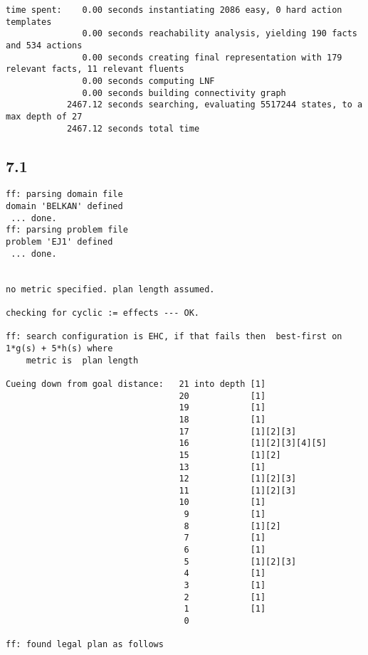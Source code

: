 \documentclass{article}
\begin{document}
\begin{lstlisting}
time spent:    0.00 seconds instantiating 2086 easy, 0 hard action templates
               0.00 seconds reachability analysis, yielding 190 facts and 534 actions
               0.00 seconds creating final representation with 179 relevant facts, 11 relevant fluents
               0.00 seconds computing LNF
               0.00 seconds building connectivity graph
            2467.12 seconds searching, evaluating 5517244 states, to a max depth of 27
            2467.12 seconds total time
\end{lstlisting}
\subsection*{7.1}
\begin{lstlisting}
ff: parsing domain file
domain 'BELKAN' defined
 ... done.
ff: parsing problem file
problem 'EJ1' defined
 ... done.


no metric specified. plan length assumed.

checking for cyclic := effects --- OK.

ff: search configuration is EHC, if that fails then  best-first on 1*g(s) + 5*h(s) where
    metric is  plan length

Cueing down from goal distance:   21 into depth [1]
                                  20            [1]
                                  19            [1]
                                  18            [1]
                                  17            [1][2][3]
                                  16            [1][2][3][4][5]
                                  15            [1][2]
                                  13            [1]
                                  12            [1][2][3]
                                  11            [1][2][3]
                                  10            [1]
                                   9            [1]
                                   8            [1][2]
                                   7            [1]
                                   6            [1]
                                   5            [1][2][3]
                                   4            [1]
                                   3            [1]
                                   2            [1]
                                   1            [1]
                                   0

ff: found legal plan as follows


\end{lstlisting}
\end{document}
